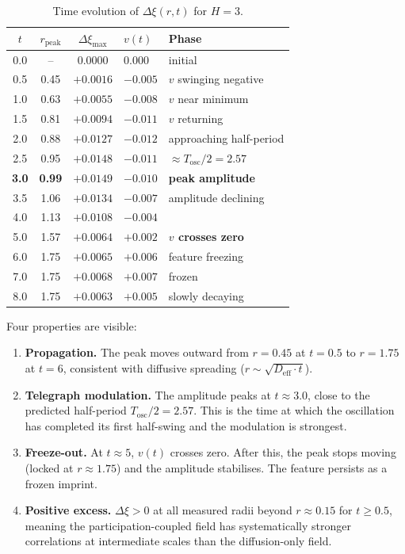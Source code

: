 \documentclass[11pt]{article}
\begin{document}
\begin{table}[h]
\centering
\begin{tabular}{@{}cccll@{}}
\toprule
\(t\) & \(r_{\mathrm{peak}}\) & \(\Delta\xi_{\max}\) & \(v(t)\) & Phase \\
\midrule
0.0 & -- & 0.0000 & \(0.000\) & initial \\
0.5 & 0.45 & \(+0.0016\) & \(-0.005\) & \(v\) swinging negative \\
1.0 & 0.63 & \(+0.0055\) & \(-0.008\) & \(v\) near minimum \\
1.5 & 0.81 & \(+0.0094\) & \(-0.011\) & \(v\) returning \\
2.0 & 0.88 & \(+0.0127\) & \(-0.012\) & approaching half-period \\
2.5 & 0.95 & \(+0.0148\) & \(-0.011\) & \(\approx T_{\mathrm{osc}}/2 = 2.57\) \\
\textbf{3.0} & \textbf{0.99} & \(\mathbf{+0.0149}\) & \(-0.010\) & \textbf{peak amplitude} \\
3.5 & 1.06 & \(+0.0134\) & \(-0.007\) & amplitude declining \\
4.0 & 1.13 & \(+0.0108\) & \(-0.004\) & \\
5.0 & 1.57 & \(+0.0064\) & \(+0.002\) & \textbf{\(v\) crosses zero} \\
6.0 & 1.75 & \(+0.0065\) & \(+0.006\) & feature freezing \\
7.0 & 1.75 & \(+0.0068\) & \(+0.007\) & frozen \\
8.0 & 1.75 & \(+0.0063\) & \(+0.005\) & slowly decaying \\
\bottomrule
\end{tabular}
\caption{Time evolution of \(\Delta\xi(r,t)\) for \(H = 3\).}
\label{tab:evolution}
\end{table}

Four properties are visible:

\begin{enumerate}
  \item \textbf{Propagation.} The peak moves outward from \(r = 0.45\) at \(t = 0.5\) to \(r = 1.75\) at \(t = 6\), consistent with diffusive spreading (\(r \sim \sqrt{D_{\mathrm{eff}} \cdot t}\)).

  \item \textbf{Telegraph modulation.} The amplitude peaks at \(t \approx 3.0\), close to the predicted half-period \(T_{\mathrm{osc}}/2 = 2.57\). This is the time at which the oscillation has completed its first half-swing and the modulation is strongest.

  \item \textbf{Freeze-out.} At \(t \approx 5\), \(v(t)\) crosses zero. After this, the peak stops moving (locked at \(r \approx 1.75\)) and the amplitude stabilises. The feature persists as a frozen imprint.

  \item \textbf{Positive excess.} \(\Delta\xi > 0\) at all measured radii beyond \(r \approx 0.15\) for \(t \geq 0.5\), meaning the participation-coupled field has systematically stronger correlations at intermediate scales than the diffusion-only field.
\end{enumerate}
\end{document}
